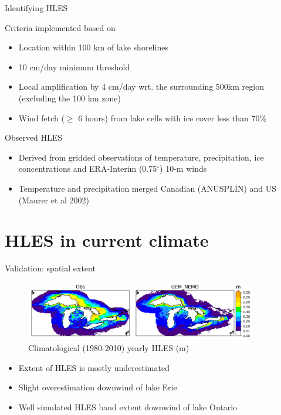 \documentclass{beamer}
\begin{document}
  \begin{frame}{Identifying HLES}

        Criteria implemented based on \citet{Notaro:2015}
        \begin{itemize}
          \item Location within 100 km of lake shorelines
          \item 10 cm/day minimum threshold
          \item Local amplification by 4 cm/day wrt. the surrounding 500km region (excluding the 100 km zone)
          \item Wind fetch ($\geq$ 6 hours) from lake cells with ice cover less than 70\%
        \end{itemize}

        Observed HLES 
        \begin{itemize}
          \item Derived from gridded observations of temperature, precipitation, ice concentrations and ERA-Interim (0.75$^\circ$) 10-m winds
          \item Temperature and precipitation merged Canadian (ANUSPLIN) and US (Maurer et al 2002)
        \end{itemize}

  \end{frame}


  \section{HLES in current climate}
  \begin{frame}{Validation: spatial extent}

      \begin{figure}
        \includegraphics[width=0.9\textwidth]{hles_clim_snow_fall_1980-2009.png}
        \caption{Climatological (1980-2010) yearly HLES (m)}
      \end{figure}

      \begin{itemize}
        \item Extent of HLES is mostly underestimated
        \item Slight overestimation downwind of lake Erie
        \item Well simulated HLES band extent downwind of lake Ontario
      \end{itemize}
  \end{frame}
\end{document}
